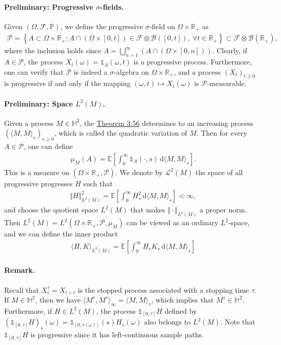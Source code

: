 \documentclass{article}
\numberwithin{equation}{section}
\newcommand{\E}{\mathbb{E}}
\renewcommand{\P}{\mathbb{P}}
\renewcommand{\d}{\mathrm{d}}
\theoremstyle{plain}
\theoremstyle{definition}
\begin{document}
\paragraph{Preliminary: Progressive $\sigma$-fields.} Given $(\Omega,\mathscr{F},\P)$, we define the progressive $\sigma$-field on $\Omega\times\mathbb{R}_+$ as
\begin{align*}
	\mathscr{P}=\left\{A\subset\Omega\times\mathbb{R}_+: A\cap(\Omega\times[0,t])\in\mathscr{F}\otimes\mathscr{B}([0,t]),\ \forall t\in\mathbb{R}_+\right\}\subset\mathscr{F}\otimes\mathscr{B}(\mathbb{R}_+),
\end{align*}
where the inclusion holds since $A=\bigcup_{n=1}^\infty (A\cap(\Omega\times[0,n]))$. Clearly, if $A\in\mathscr{P}$, the process $X_t(\omega)=\mathds{1}_A(\omega,t)$ is a progressive process. Furthermore, one can verify that $\mathscr{P}$ is indeed a $\sigma$-algebra on $\Omega\times\mathbb{R}_+$, and a process $(X_t)_{t\geq 0}$ is progressive if and only if the mapping $(\omega,t)\mapsto X_t(\omega)$ is $\mathscr{P}$-measurable.

\paragraph{Preliminary: Space $L^2(M)$.} Given a process $M\in\mathbb{H}^2$, the \hyperref[thm:3.56]{Theorem 3.56} determines to an increasing process $(\langle M,M\rangle_s)_{s\geq 0}$, which is called the quadratic variation of $M$. Then for every $A\in\mathscr{P}$, one can define
\begin{align*}
	\mu_M(A)=\E\left[\int_0^\infty\mathds{1}_A(\cdot,s)\,\d \langle M,M\rangle_s\right].
\end{align*}
This is a measure on $(\Omega\times\mathbb{R}_+,\mathscr{P})$. We denote by $\mathcal{L}^2(M)$ the space of all progressive progresses $H$ such that
\begin{align*}
	\Vert H\Vert_{L^2(M)}^2=\E\left[\int_0^\infty H_s^2\,\d \langle M,M\rangle_s\right]<\infty,
\end{align*}
and choose the quotient space $L^2(M)$ that makes $\Vert\cdot\Vert_{L^2(M)}$ a proper norm. Then $L^2(M)=L^2(\Omega\times\mathbb{R}_+,\mathscr{P},\mu_M)$ can be viewed as an ordinary $L^2$-space, and we can define the inner product
\begin{align*}
	\langle H,K\rangle_{L^2(M)}=\E\left[\int_0^\infty H_sK_s\,\d \langle M,M\rangle_s\right]
\end{align*}

\paragraph{Remark.} Recall that $X_t^\tau = X_{t\wedge \tau}$ is the stopped process associated with a stopping time $\tau$. If $M\in\mathbb{H}^2$, then we have $\langle M^\tau,M^\tau\rangle_\infty = \langle M,M\rangle_\tau$, which implies that $M^\tau\in\mathbb{H}^2$. Furthermore, if $H\in L^2(M)$, the process $\mathds{1}_{[0,\tau]}H$ defined by $(\mathds{1}_{[0,\tau]}H)_s(\omega)=\mathds{1}_{[0,\tau(\omega)]}(s)H_s(\omega)$ also belongs to $L^2(M)$. Note that $\mathds{1}_{[0,\tau]}H$ is progressive since it has left-continuous sample paths.
\end{document}
